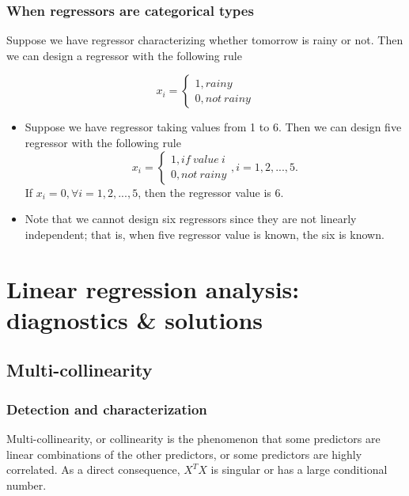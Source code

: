 \begin{refsection}
\subsubsection{When regressors are categorical types}

\begin{note}
	Suppose we have regressor characterizing whether tomorrow is rainy or not. Then we can design a regressor with the following rule
	
	$$x_i = \begin{cases*}
	1, rainy\\
	0, not~rainy
	\end{cases*}$$	
\end{note}


\begin{note}
\begin{itemize}
	\item 	Suppose we have regressor taking values from 1 to 6. Then we can design five regressor with the following rule
	$$x_i = \begin{cases*}
	1, if~value~i\\
	0, not~rainy
	\end{cases*}, i=1,2,...,5.$$
	If $x_i=0,\forall i=1,2,...,5$, then the regressor value is 6.
	\item Note that we cannot design six regressors since they are not linearly independent; that is, when five regressor value is known, the six is known.
\end{itemize}	
	
\end{note}





\section{Linear regression analysis: diagnostics \& solutions}



\subsection{Multi-collinearity}
\subsubsection{Detection and characterization}
\begin{definition}
	Multi-collinearity, or collinearity is the phenomenon that some predictors are linear combinations of the other predictors, or some predictors are highly correlated. As a direct consequence, $X^TX$ is singular or has a large conditional number.
\end{definition}



\end{refsection}
